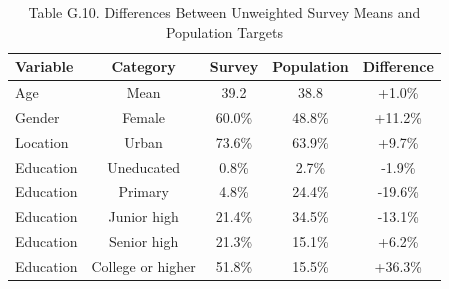 \begin{table}[!htbp]
\centering
\caption{Table G.10. Differences Between Unweighted Survey Means and Population Targets}
\begin{tabular}{lcccc}
\hline
Variable & Category & Survey & Population & Difference \\
\hline
Age & Mean & 39.2 & 38.8 & +1.0\% \\
Gender & Female & 60.0\% & 48.8\% & +11.2\% \\
Location & Urban & 73.6\% & 63.9\% & +9.7\% \\
Education & Uneducated & 0.8\% & 2.7\% & -1.9\% \\
Education & Primary & 4.8\% & 24.4\% & -19.6\% \\
Education & Junior high & 21.4\% & 34.5\% & -13.1\% \\
Education & Senior high & 21.3\% & 15.1\% & +6.2\% \\
Education & College or higher & 51.8\% & 15.5\% & +36.3\% \\
\hline
\end{tabular}
\end{table}
